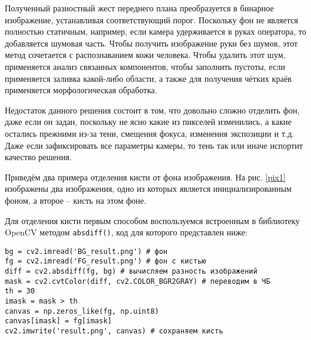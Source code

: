 Полученный разностный жест переднего плана преобразуется в бинарное изображение, устанавливая
соответствующий порог. Поскольку фон не является полностью статичным, например, если камера
удерживается в руках оператора, то добавляется шумовая часть. Чтобы получить изображение руки
без шумов, этот метод сочетается с распознаванием кожи человека. Чтобы удалить этот шум, 
применяется анализ связанных компонентов, чтобы заполнить пустоты, если применяется заливка
какой-либо области, а также для получения чётких краёв применяется морфологическая обработка.

Недостаток данного решения состоит в том, что довольно сложно отделить фон, даже если он задан,
поскольку не ясно какие из пикселей изменились, а какие остались прежними из-за тени, смещения
фокуса, изменения экспозиции и т.д. Даже если зафиксировать все параметры камеры, то тень так
или иначе испортит качество решения.

Приведём два примера отделения кисти от фона изображения. На рис. \ref{pix1} изображены два
изображения, одно из которых является инициализированным фоном, а второе -- кисть на этом фоне.


Для отделения кисти первым способом воспользуемся встроенным в библиотеку OpenCV методом
{\tt absdiff()}, код для которого представлен ниже:
\begin{verbatim}
bg = cv2.imread('BG_result.png') # фон
fg = cv2.imread('FG_result.png') # фон с кистью
diff = cv2.absdiff(fg, bg) # вычисляем разность изображений
mask = cv2.cvtColor(diff, cv2.COLOR_BGR2GRAY) # переводим в ЧБ
th = 30
imask = mask > th
canvas = np.zeros_like(fg, np.uint8)
canvas[imask] = fg[imask]
cv2.imwrite('result.png', canvas) # сохраняем кисть
\end{verbatim}

